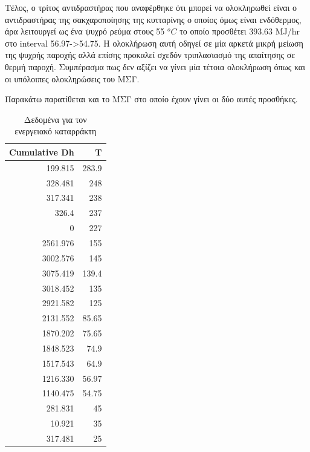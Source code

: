 \documentclass[11pt]{article}
\begin{document}
Τέλος, ο τρίτος αντιδραστήρας που αναφέρθηκε ότι μπορεί να ολοκληρωθεί είναι ο αντιδραστήρας της σακχαροποίησης της κυτταρίνης ο οποίος όμως είναι ενδόθερμος, άρα λειτουργεί ως ένα ψυχρό ρεύμα στους 55 \(^oC\) το οποίο προσθέτει 393.63 MJ/hr στο interval 56.97->54.75. Η ολοκλήρωση αυτή οδηγεί σε μία αρκετά μικρή μείωση της ψυχρής παροχής αλλά επίσης προκαλεί σχεδόν τριπλασιασμό της απαίτησης σε θερμή παροχή. Συμπέρασμα πως δεν αξίζει να γίνει μία τέτοια ολοκλήρωση όπως και οι υπόλοιπες ολοκληρώσεις του ΜΣΓ.

Παρακάτω παρατίθεται και το ΜΣΓ στο οποίο έχουν γίνει οι δύο αυτές προσθήκες.
\begin{table}[htbp]
\caption{Δεδομένα για τον ενεργειακό καταρράκτη}
\centering
\begin{tabular}{rr}
Cumulative  Dh & T\\
\hline
199.815 & 283.9\\
328.481 & 248\\
317.341 & 238\\
326.4 & 237\\
0 & 227\\
2561.976 & 155\\
3002.576 & 145\\
3075.419 & 139.4\\
3018.452 & 135\\
2921.582 & 125\\
2131.552 & 85.65\\
1870.202 & 75.65\\
1848.523 & 74.9\\
1517.543 & 64.9\\
1216.330 & 56.97\\
1140.475 & 54.75\\
281.831 & 45\\
10.921 & 35\\
317.481 & 25\\
\end{tabular}
\end{table}
\end{document}
